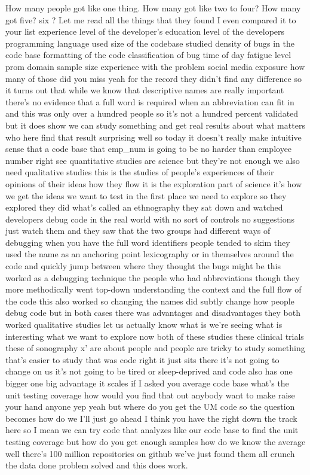 \documentclass[conference, compsoc, twoside]{IEEEtran}
\begin{document}
How many people got like one thing. 
How many got like two to four? How many got five? six ?
Let me read all the things that they found I even compared it to your list
experience level of the developer's
education level of the developers
programming language used size of the
codebase studied density of bugs in the
code base formatting of the code
classification of bug time of day
fatigue level prom domain sample size
experience with the problem social media
exposure how many of those did you miss
yeah for the record they didn't find any
difference so it turns out that while we
know that descriptive names are really
important there's no evidence that a
full word is required when an
abbreviation can fit in and this was
only over a hundred people so it's not a
hundred percent validated but it does
show we can study something and get real
results about what matters who here find
that result surprising well so today it
doesn't really make intuitive sense that
a code base that emp\_num is going to be
no harder than employee number right see
quantitative studies are science but
they're not enough we also need
qualitative studies this is the studies
of people's experiences of their
opinions of their ideas how they flow it
is the exploration part of science it's
how we get the ideas we want to test in
the first place we need to explore so
they explored they did what's called an
ethnography they sat down and watched
developers debug code in the real world
with no sort of controls no suggestions
just watch them and they saw that the
two groups had different ways of
debugging when you have the full word
identifiers people tended to skim they
used the name as an anchoring point
lexicography or in themselves around the code and
quickly jump between where they thought
the bugs might be this worked as a
debugging technique the people who had
abbreviations though they more
methodically went top-down understanding
the context and the full flow of the
code this also worked so changing the
names did subtly change how people debug
code but in both cases there was
advantages and disadvantages they both
worked qualitative studies let us
actually know what is we're seeing what
is interesting what we want to explore
now both of these studies these clinical
trials these of sonography x' are about
people and people are tricky to study
something that's easier to study that
was code right it just sits there it's
not going to change on us it's not going
to be tired or sleep-deprived and code
also has one bigger one big advantage it
scales if I asked you average code base
what's the unit testing coverage how
would you find that out anybody want to
make raise your hand anyone yep yeah but
where do you get the UM code so the
question becomes how do we I'll just go
ahead I think you have the right down
the track here so I mean we can try code
that analyzes like our code base to find
the unit testing coverage but how do you
get enough samples how do we know the
average well there's 100 million
repositories on github we've just found
them all crunch the data done problem solved and this does work.
\end{document}
